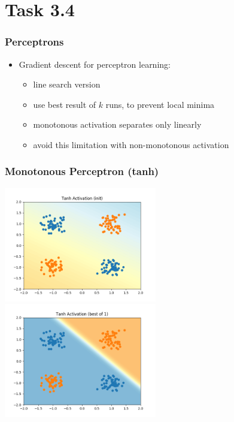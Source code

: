\documentclass{beamer}
\begin{document}
\section{Task 3.4}
\begin{frame}
	\frametitle{Perceptrons}
	\begin{itemize}
	\item Gradient descent for perceptron learning:
		\begin{itemize}
			\item line search version
			\item use best result of $k$ runs, to prevent local minima
			\item monotonous activation separates only linearly
			\item avoid this limitation with non-monotonous activation 	
		\end{itemize}
	\end{itemize}
\end{frame}
\begin{frame}
	\frametitle{Monotonous Perceptron (tanh)}
	\includegraphics[width=0.5\textwidth]{"graphics/Tanh Activation (init)"}%
	\includegraphics[width=0.5\textwidth]{"graphics/Tanh Activation (best of 1)"}
\end{frame}
\end{document}
